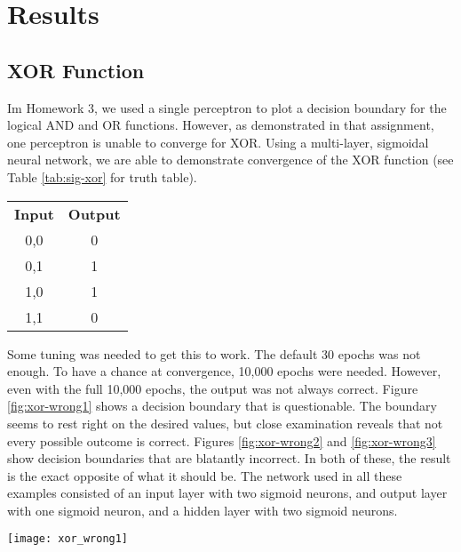 \documentclass[letter,11pt,titlepage]{article}
\begin{document}
\iffalse
\section{Results}
\subsection{XOR Function}
Im Homework 3\cite{HW3}, we used a single perceptron to plot a decision boundary for the logical AND and OR functions. However, as demonstrated in that assignment, one perceptron is unable to converge for XOR. Using a multi-layer, sigmoidal neural network, we are able to demonstrate convergence of the XOR function (see Table \ref{tab:sig-xor} for truth table).
\begin{center}
    \centering
    \begin{tabular}{||c|c||}
        \textbf{Input}  &   \textbf{Output}     \\
        0,0             &   0                   \\
        0,1             &   1                   \\
        1,0             &   1                   \\
        1,1             &   0                   \\
    \end{tabular}
    \label{tab:sig-xor}
\end{center}

Some tuning was needed to get this to work. The default 30 epochs was not enough. To have a chance at convergence, 10,000 epochs were needed. However, even with the full 10,000 epochs, the output was not always correct. Figure \ref{fig:xor-wrong1} shows a decision boundary that is questionable. The boundary seems to rest right on the desired values, but close examination reveals that not every possible outcome is correct. Figures \ref{fig:xor-wrong2} and \ref{fig:xor-wrong3} show decision boundaries that are blatantly incorrect. In both of these, the result is the exact opposite of what it should be. The network used in all these examples consisted of an input layer with two sigmoid neurons, and output layer with one sigmoid neuron, and a hidden layer with two sigmoid neurons.

\begin{center}
    \centering
    \texttt{[image: xor\_wrong1]}
    \label{fig:xor-wrong1}
\end{center}
\end{document}

